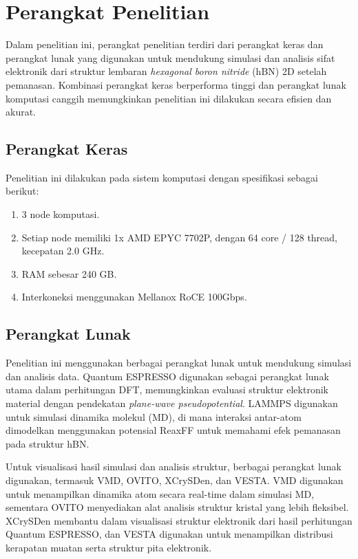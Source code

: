 \section{Perangkat Penelitian}
Dalam penelitian ini, perangkat penelitian terdiri dari perangkat keras dan perangkat lunak yang digunakan untuk mendukung simulasi dan analisis sifat elektronik dari struktur lembaran \textit{hexagonal boron nitride} (hBN) 2D setelah pemanasan. Kombinasi perangkat keras berperforma tinggi dan perangkat lunak komputasi canggih memungkinkan penelitian ini dilakukan secara efisien dan akurat.

\subsection{Perangkat Keras}
Penelitian ini dilakukan pada sistem komputasi dengan spesifikasi sebagai berikut:
\begin{enumerate}
    \item 3 node komputasi.
    \item Setiap node memiliki 1x AMD EPYC 7702P, dengan 64 core / 128 thread, kecepatan 2.0 GHz.
    \item RAM sebesar 240 GB.
    \item Interkoneksi menggunakan Mellanox RoCE 100Gbps.
\end{enumerate}

\subsection{Perangkat Lunak}
Penelitian ini menggunakan berbagai perangkat lunak untuk mendukung simulasi dan analisis data. Quantum ESPRESSO digunakan sebagai perangkat lunak utama dalam perhitungan DFT, memungkinkan evaluasi struktur elektronik material dengan pendekatan \textit{plane-wave pseudopotential}. LAMMPS digunakan untuk simulasi dinamika molekul (MD), di mana interaksi antar-atom dimodelkan menggunakan potensial ReaxFF untuk memahami efek pemanasan pada struktur hBN. 

Untuk visualisasi hasil simulasi dan analisis struktur, berbagai perangkat lunak digunakan, termasuk VMD, OVITO, XCrySDen, dan VESTA. VMD digunakan untuk menampilkan dinamika atom secara real-time dalam simulasi MD, sementara OVITO menyediakan alat analisis struktur kristal yang lebih fleksibel. XCrySDen membantu dalam visualisasi struktur elektronik dari hasil perhitungan Quantum ESPRESSO, dan VESTA digunakan untuk menampilkan distribusi kerapatan muatan serta struktur pita elektronik.

